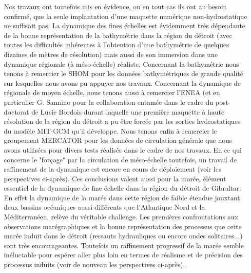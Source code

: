 Nos travaux ont toutefois mis en évidence, ou en tout cas ils ont au besoin confirmé, que la seule implantation d'une maquette numérique non-hydrostatique ne suffisait pas. La dynamique des fines échelles est évidemment très dépendante de la bonne représentation de la bathymétrie dans la région du détroit (avec toutes les difficultés inhérentes à l'obtention d'une bathymétrie de quelques dizaines de mètres de résolution) mais aussi de son immersion dans une dynamique régionale (à méso-échelle) réaliste. Concernant la bathymétrie nous tenons à remercier le SHOM pour les données bathymétriques de grande qualité sur lesquelles nous avons pu appuyer nos travaux. Concernant la dynamique de régionale de moyen échelle, nous tenons aussi à remercier l'ENEA (et en particulier G. Sannino pour la collaboration entamée dans le cadre du post-doctorat de Lucie Bordois durant laquelle une première maquette à haute résolution de la région du détroit a pu être forcée par les sorties hydrostatiques du modèle MIT-GCM qu'il développe. Nous tenons enfin à remercier le groupement MERCATOR pour les données de circulation générale que nous avons utilisées pour divers tests réalisés dans le cadre de nos travaux. En ce qui concerne le "forçage" par la circulation de méso-échelle toutefois, un travail de raffinement de la dynamique est encore en cours de déploiement (voir les perspectives ci-après). Ces conclusions valent aussi pour la marée, élément essentiel de la dynamique de fine échelle dans la région du détroit de Gibraltar. En effet la dynamique de la marée dans cette région de faible étendue jouxtant deux bassins océaniques aussi différents que l'Atlantique Nord et la Méditerranéen, relève du véritable challenge. Les premières confrontations aux observations marégraphiques et la bonne représentation des processus que cette marée induit dans le détroit (ressauts hydrauliques ou encore ondes solitaires...) sont très encourageantes. Toutefois un raffinement progressif de la marée semble inéluctable pour espérer aller plus loin en termes de réalisme et de précision des processus induits (voir de nouveau les perspectives ci-après).\\

